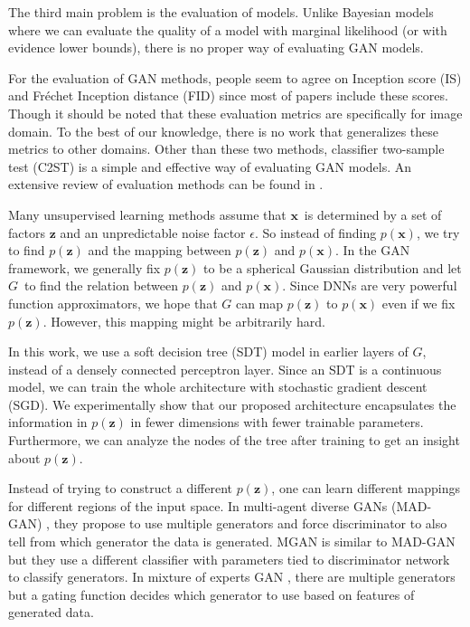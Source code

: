 \documentclass[a4paper,onesided,12pt]{report}
\begin{document}
The third main problem is the evaluation of models. Unlike Bayesian models where we can evaluate the quality of a model with marginal likelihood (or with evidence lower bounds), there is no proper way of evaluating GAN models.

For the evaluation of GAN methods, people seem to agree on Inception score (IS) \cite{improvedtechniques} and Fr\'echet Inception distance (FID) \cite{twotimes} since most of papers include these scores. Though it should be noted that these evaluation metrics are specifically for image domain. To the best of our knowledge, there is no work that generalizes these metrics to other domains. Other than these two methods, classifier two-sample test (C2ST) \cite{twosample} is a simple and effective way of evaluating GAN models. An extensive review of evaluation methods can be found in \cite{evalreview}.

Many unsupervised learning methods assume that $\boldsymbol{x}$~is determined by a set of factors $\boldsymbol{z}$ and an unpredictable noise factor $\epsilon$. So instead of finding $p(\boldsymbol{x})$, we try to find $p(\boldsymbol{z})$ and the mapping between $p(\boldsymbol{z})$ and $p(\boldsymbol{x})$. In the GAN framework, we generally fix $p(\boldsymbol{z})$ to be a spherical Gaussian distribution and let $G$~to find the relation between $p(\boldsymbol{z})$ and $p(\boldsymbol{x})$. Since DNNs are very powerful function approximators, we hope that $G$ can map $p(\boldsymbol{z})$ to $p(\boldsymbol{x})$ even if we fix $p(\boldsymbol{z})$. However, this mapping might be arbitrarily hard.

In this work, we use a soft decision tree (SDT) model \cite{sdt} in earlier layers of $G$, instead of a densely connected perceptron layer. Since an SDT is a continuous model, we can train the whole architecture with stochastic gradient descent (SGD). We experimentally show that our proposed architecture encapsulates the information in $p(\boldsymbol{z})$ in fewer dimensions with fewer trainable parameters. Furthermore, we can analyze the nodes of the tree after training to get an insight about $p(\boldsymbol{z})$.

Instead of trying to construct a different $p(\boldsymbol{z})$, one can learn different mappings for different regions of the input space. In multi-agent diverse GANs (MAD-GAN) \cite{madgan}, they propose to use multiple generators and force discriminator to also tell from which generator the data is generated.  MGAN \cite{mgan} is similar to MAD-GAN but they use a different classifier with parameters tied to discriminator network to classify generators. In mixture of experts GAN \cite{megan}, there are multiple generators but a gating function decides which generator to use based on features of generated data.
\end{document}
